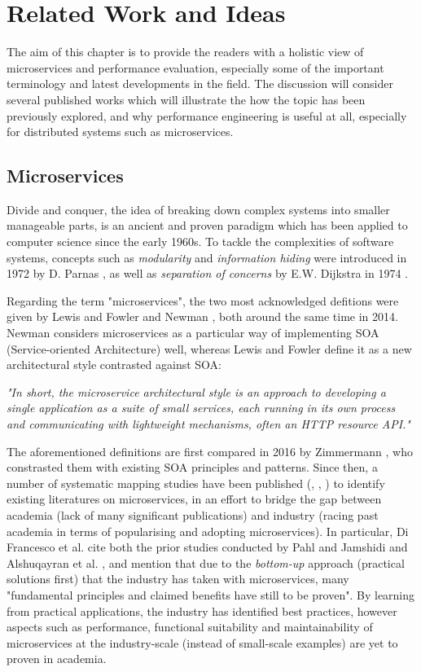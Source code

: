 \chapter{Related Work and Ideas}

The aim of this chapter is to provide the readers with a holistic view of microservices and performance evaluation, especially some of the important terminology and latest developments in the field. The discussion will consider several published works which will illustrate the how the topic has been previously explored, and why performance engineering is useful at all, especially for distributed systems such as microservices.

\section{Microservices}

Divide and conquer, the idea of breaking down complex systems into smaller manageable parts, is an ancient and proven paradigm which has been applied to computer science since the early 1960s. To tackle the complexities of software systems, concepts such as \textit{modularity} and \textit{information hiding} were introduced in 1972 by D. Parnas \cite{parnas72}, as well as \textit{separation of concerns} by E.W. Dijkstra in 1974 \cite{dijkstra74}.

Regarding the term "microservices", the two most acknowledged defitions were given by Lewis and Fowler \cite{lewis14} and Newman \cite{newman14}, both around the same time in 2014. Newman considers microservices as a particular way of implementing SOA (Service-oriented Architecture) well, whereas Lewis and Fowler define it as a new architectural style contrasted against SOA:

\textit{"In short, the microservice architectural style is an approach to developing a single application as a suite of small services, each running in its own process and communicating with lightweight mechanisms, often an HTTP resource API."}

The aforementioned definitions are first compared in 2016 by Zimmermann \cite{zimmermann16}, who constrasted them with existing SOA principles and patterns. Since then, a number of systematic mapping studies have been published (\cite{pahl16}, \cite{alshuqayran16}, \cite{difrancesco19}) to identify existing literatures on microservices, in an effort to bridge the gap between academia (lack of many significant publications) and industry (racing past academia in terms of popularising and adopting
microservices). In particular, Di Francesco et al. \cite{difrancesco19} cite both the prior studies conducted by Pahl and Jamshidi \cite{pahl16} and Alshuqayran et al. \cite{alshuqayran16}, and mention that due to the \textit{bottom-up} approach (practical solutions first) that the industry has taken with microservices, many "fundamental principles and claimed benefits have still to be proven". By learning from practical applications, the industry has identified best practices, however aspects such as performance, functional suitability and maintainability of microservices at the industry-scale (instead of small-scale examples) are yet to proven in academia.

